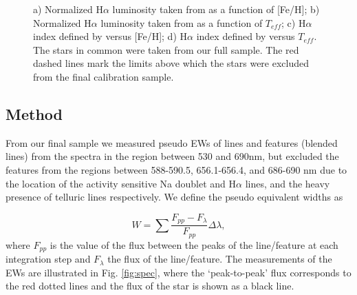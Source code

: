 \documentclass{aa}
\begin{document}
\begin{figure}[]
\begin{center}
\end{center}
\caption{ a) Normalized H$\alpha$ luminosity taken from \citet{Reiners-2012} as a function of [Fe/H]; b) Normalized H$\alpha$ luminosity taken from \citet{Reiners-2012} as a function of $T_{eff}$; c) H${\alpha}$ index defined by \citet{Gomes_da_Silva-2011} versus [Fe/H]; d) H${\alpha}$ index defined by \citet{Gomes_da_Silva-2011} versus $T_{eff}$. The stars in common were taken from our full sample. The red dashed lines mark the limits above which the stars were excluded from the final calibration sample.}
\label{fig:act_test}
\end{figure}



\subsection{Method}
\label{sec:method}

From our final sample we measured pseudo EWs of lines and features (blended lines) from the spectra in the region between 530 and 690nm, but excluded the features from the regions between 588-590.5, 656.1-656.4, and 686-690 nm due to the location of the activity sensitive Na doublet and H$\alpha$ lines, and the heavy presence of telluric lines respectively. We define the pseudo equivalent widths as 

\begin{equation}
W = \sum{\frac{F_{pp}-F_{\lambda}}{F_{pp}}\Delta\lambda},
\label{ew}
\end{equation}
where $F_{pp}$ is the value of the flux between the peaks of the line/feature at each integration step and $F_{\lambda}$ the flux of the line/feature. The measurements of the EWs are illustrated in Fig. \ref{fig:spec}, where the `peak-to-peak' flux corresponds to the red dotted lines and the flux of the star is shown as a black line. 
\end{document}
